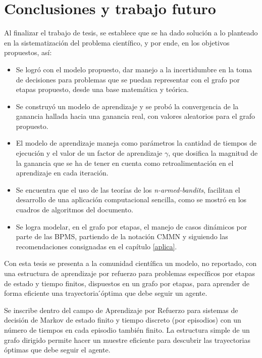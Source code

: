 \chapter{Conclusiones y trabajo futuro}

Al finalizar el trabajo de tesis, se establece que se ha dado solución a lo planteado en la sistematización del problema científico, y por ende, en los objetivos propuestos, así:

\begin{itemize}
    \item Se logró con el modelo propuesto, dar manejo a la incertidumbre en la toma de decisiones para problemas que se puedan representar con el grafo por etapas propuesto, desde una base matemática y teórica.    
    \item Se construyó un modelo de aprendizaje y se probó la convergencia de la ganancia hallada hacia una ganancia real, con valores aleatorios para el grafo propuesto.   
    \item El modelo de aprendizaje maneja como parámetros la cantidad de tiempos de ejecución y el valor de un factor de aprendizaje $\gamma$, que dosifica la magnitud de la ganancia que se ha de tener en cuenta como retroalimentación en el aprendizaje en cada iteración.
    \item Se encuentra que el uso de las teorías de los \textit{n-armed-bandits}, facilitan el desarrollo de una aplicación computacional sencilla, como se mostró en los cuadros de algoritmos del documento.   
    \item Se logra modelar, en el grafo por etapas, el manejo de casos dinámicos por parte de las BPMS, partiendo de la notación CMMN y siguiendo las recomendaciones consignadas en el capítulo \ref{aplica}.   
\end{itemize} 

Con esta tesis se presenta a la comunidad científica un modelo, no reportado, con una estructura de aprendizaje por refuerzo para problemas específicos por etapas de estado y tiempo finitos, dispuestos en un grafo por etapas, para aprender de forma eficiente una trayectoria ́óptima que debe seguir un agente.

Se inscribe dentro del campo de Aprendizaje por Refuerzo para sistemas de decisión de Markov de estado finito y tiempo discreto (por episodios) con un número de tiempos en cada episodio también finito. La estructura simple de un grafo dirigido permite hacer un muestre eficiente para descubrir las trayectorias óptimas que debe seguir el agente. 


